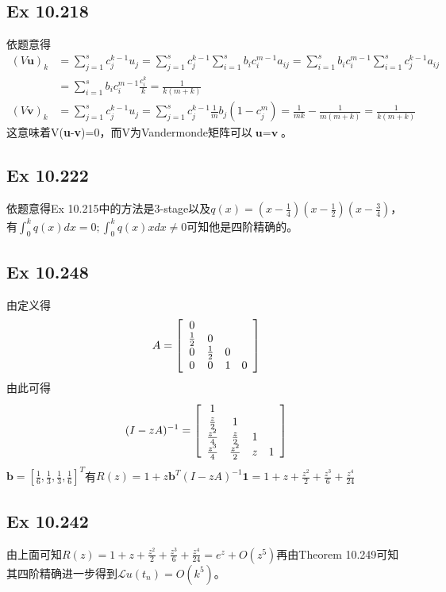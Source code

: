 \documentclass{article}
\begin{document}
\subsection*{Ex 10.218}
\indent 依题意得
\begin{equation*}
\begin{aligned}
(V\textbf{u})_k&=\sum_{j=1}^sc_j^{k-1}u_j=\sum_{j=1}^sc_j^{k-1}\sum_{i=1}^sb_ic_i^{m-1}a_{ij}=\sum_{i=1}^sb_ic_i^{m-1}\sum_{i=1}^sc_j^{k-1}a_{ij}\\
			&=\sum_{i=1}^sb_ic_i^{m-1}\frac{c_i^k}{k}=\frac{1}{k(m+k)}\\
(V\textbf{v})_k&=\sum_{j=1}^sc_j^{k-1}u_j=\sum_{j=1}^sc_j^{k-1}\frac{1}{m}b_j(1-c_j^m)=\frac{1}{mk}-\frac{1}{m(m+k)}=\frac{1}{k(m+k)}
\end{aligned}
\end{equation*}
这意味着V(\textbf{u}-\textbf{v})=0，而V为Vandermonde矩阵可以$\textbf{u}=\textbf{v}$。

\subsection*{Ex 10.222}
\indent 依题意得Ex 10.215中的方法是3-stage以及$q(x)=(x-\frac{1}{4})(x-\frac{1}{2})(x-\frac{3}{4})$，有$\int_0^kq(x)dx=0;\int_0^kq(x)xdx\ne0$可知他是四阶精确的。

\subsection*{Ex 10.248}
\indent 由定义得
$$
A=\left[ \begin{array}{c c c c}
0 & & & \\
\frac{1}{2} & 0 & & \\
0 & \frac{1}{2} & 0 & \\
0 & 0 & 1 & 0
\end{array}
\right]
$$
由此可得
$$
(I-zA)^{-1}=\left[ \begin{array}{c c c c}
1 & & & \\
\frac{z}{2} & 1 & & \\
\frac{z^2}{4} & \frac{z}{2} & 1 & \\
\frac{z^3}{4} & \frac{z^2}{2} & z & 1
\end{array}
\right]
$$
$\textbf{b}=[\frac{1}{6},\frac{1}{3},\frac{1}{3},\frac{1}{6}]^{T}$有$R(z)=1+z\textbf{b}^T(I-zA)^{-1}\textbf{1}=1+z+\frac{z^2}{2}+\frac{z^3}{6}+\frac{z^4}{24}$

\subsection*{Ex 10.242}
\indent 由上面可知$R(z)=1+z+\frac{z^2}{2}+\frac{z^3}{6}+\frac{z^4}{24}=e^z+O(z^5)$再由Theorem 10.249可知其四阶精确进一步得到$\mathcal{L}u(t_n)=O(k^5)$。
\end{document}
